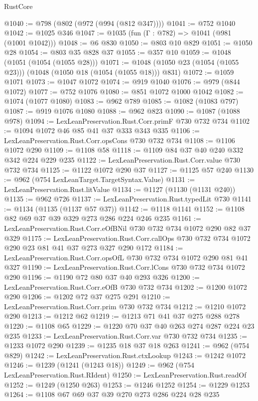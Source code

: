 \begin{lexlean}{RustCore}
\begin{coremodule}
@1040 := @798 (@802 (@972 (@994 (@812 @347))))
@1041 := @752 @1040
@1042 := @1025 @346
@1047 := @1035 (fun (Γ : @782) => @1041 (@981 (@1001 @1042)))
@1048 := @6 @830
@1050 := @803 @10 @829
@1051 := @1050 @28
@1054 := @803 @35 @828 @37
@1055 := @357 @10
@1059 := @1048 (@1051 (@1054 (@1055 @28)))
@1071 := @1048 (@1050 @23 (@1054 (@1055 @23))) (@1048 (@1050 @18 (@1054 (@1055 @18))) @831)
@1072 := @1059 @1071
@1073 := @1047 @1072
@1074 := @919 @1040
@1076 := @979 (@844 @1072)
@1077 := @752 @1076
@1080 := @851 @1072 @1000 @1042
@1082 := @1074 (@1077 @1080)
@1083 := @962 @789
@1085 := @1082 (@1083 @797)
@1087 := @919 @1076 @1080
@1088 := @962 @823
@1090 := @1087 (@1088 @978)
@1094 := LexLeanPreservation.Rust.Corr.primF @730 @732 @734
@1102 := @1094 @1072 @46 @85 @41 @37 @333 @343 @335
@1106 := LexLeanPreservation.Rust.Corr.opsCons @730 @732 @734
@1108 := @1106 @1072 @290
@1109 := @1108 @58
@1118 := @1109 @84 @37 @40 @240 @332 @342 @224 @229 @235
@1122 := LexLeanPreservation.Rust.Corr.value @730 @732 @734
@1125 := @1122 @1072 @290 @37
@1127 := @1125 @57 @240
@1130 := @962 (@754 LexLeanTarget.TargetSyntax.Value)
@1131 := LexLeanPreservation.Rust.litValue
@1134 := @1127 (@1130 (@1131 @240))
@1135 := @962 @726
@1137 := LexLeanPreservation.Rust.typedLit @730
@1141 := @1134 (@1135 (@1137 @57 @37))
@1142 := @1118 @1141
@1152 := @1108 @82 @69 @37 @39 @329 @273 @286 @224 @246 @235
@1161 := LexLeanPreservation.Rust.Corr.eOfBNil @730 @732 @734 @1072 @290 @82 @37 @329
@1175 := LexLeanPreservation.Rust.Corr.callOps
    @730
    @732
    @734
    @1072
    @290
    @23
    @81
    @41
    @37
    @273
    @327
    @290
    @172
@1184 := LexLeanPreservation.Rust.Corr.opsOfL @730 @732 @734 @1072 @290 @81 @41 @327
@1190 := LexLeanPreservation.Rust.Corr.lCons @730 @732 @734 @1072 @290
@1196 := @1190 @72 @80 @37 @40 @293 @326
@1200 := LexLeanPreservation.Rust.Corr.eOfB @730 @732 @734
@1202 := @1200 @1072 @290
@1206 := @1202 @72 @37 @275 @291
@1210 := LexLeanPreservation.Rust.Corr.prim @730 @732 @734
@1212 := @1210 @1072 @290
@1213 := @1212 @62
@1219 := @1213 @71 @41 @37 @275 @288 @278
@1220 := @1108 @65
@1229 := @1220 @70 @37 @40 @263 @274 @287 @224 @23 @235
@1233 := LexLeanPreservation.Rust.Corr.var @730 @732 @734
@1235 := @1233 @1072 @290
@1239 := @1235 @18 @37 @18 @263
@1241 := @962 (@754 @829)
@1242 := LexLeanPreservation.Rust.ctxLookup
@1243 := @1242 @1072
@1246 := @1239 (@1241 (@1243 @18))
@1249 := @962 (@754 LexLeanPreservation.Rust.RIdent)
@1250 := LexLeanPreservation.Rust.readOf
@1252 := @1249 (@1250 @263)
@1253 := @1246 @1252
@1254 := @1229 @1253
@1264 := @1108 @67 @69 @37 @39 @270 @273 @286 @224 @28 @235

\end{coremodule}
\end{lexlean}
